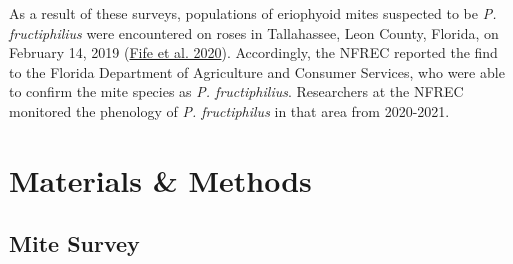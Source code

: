 \documentclass[12pt,final,CPage]{ufthesis}
\begin{document}
{  As a result of these surveys, populations of eriophyoid mites suspected to be \emph{P. fructiphilius} were encountered on roses in Tallahassee, Leon County, Florida, on February 14, 2019 (\protect\hyperlink{ref-Fife2020}{Fife et al. 2020}). Accordingly, the NFREC reported the find to the Florida Department of Agriculture and Consumer Services, who were able to confirm the mite species as \emph{P. fructiphilius}. Researchers at the NFREC monitored the phenology of \emph{P. fructiphilus} in that area from 2020-2021.

  \hypertarget{mm-survey-pheno}{%
  \section{Materials \& Methods}\label{mm-survey-pheno}}

  \hypertarget{mm-survey}{%
  \subsection{Mite Survey}\label{mm-survey}}

}
\end{document}
